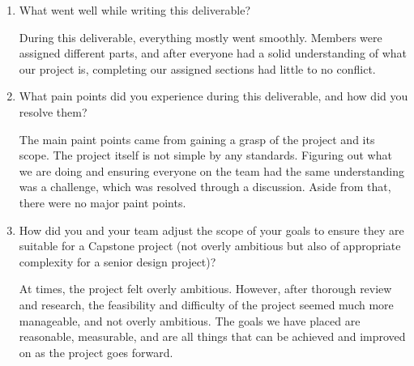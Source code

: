 \documentclass{article}
\begin{document}
\begin{enumerate}
    \item What went well while writing this deliverable? 
    
    During this deliverable, everything mostly went smoothly. Members were
    assigned different parts, and after everyone had a solid understanding of
    what our project is, completing our assigned sections had little to no
    conflict.
    
    \item What pain points did you experience during this deliverable, and how
    did you resolve them?

    The main paint points came from gaining a grasp of the project and its
    scope. The project itself is not simple by any standards. Figuring out what
    we are doing and ensuring everyone on the team had the same understanding
    was a challenge, which was resolved through a discussion. Aside from that,
    there were no major paint points.

    
    \item How did you and your team adjust the scope of your goals to ensure
    they are suitable for a Capstone project (not overly ambitious but also of
    appropriate complexity for a senior design project)?

    At times, the project felt overly ambitious. However, after thorough review
    and research, the feasibility and difficulty of the project seemed much more
    manageable, and not overly ambitious. The goals we have placed are
    reasonable, measurable, and are all things that can be achieved and improved
    on as the project goes forward.
\end{enumerate}  
\end{document}
